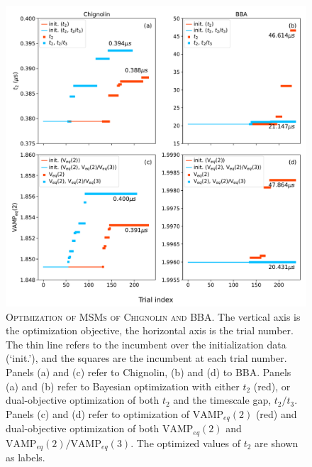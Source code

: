 \documentclass[journal=jacsat,manuscript=article]{achemso}
\begin{document}
\begin{figure}[ht]
    \centering
    \includegraphics[width=\columnwidth]{results3/optimisation_summary.pdf}
    \caption{\textsc{Optimization of MSMs of Chignolin and BBA}. The vertical axis is the optimization objective, the horizontal axis is the trial number. The thin line refers to the incumbent over the initialization data (`init.'), and the squares are the incumbent at each trial number. Panels (a) and (c) refer to Chignolin, (b) and (d) to BBA. Panels (a) and (b) refer to Bayesian optimization with either $t_{2}$  (red), or dual-objective optimization of both $t_{2}$ and the timescale gap, $t_{2}/t_{3}$.  Panels (c) and (d) refer to optimization of  $\mathrm{VAMP}_{eq}(2)$ (red) and dual-objective optimization of both  $\mathrm{VAMP}_{eq}(2)$ and $\mathrm{VAMP}_{eq}(2)/\mathrm{VAMP}_{eq}(3)$. The optimized values of $t_2$ are shown as labels. }
    \label{fig:optimisation_trials}
\end{figure}
\end{document}
